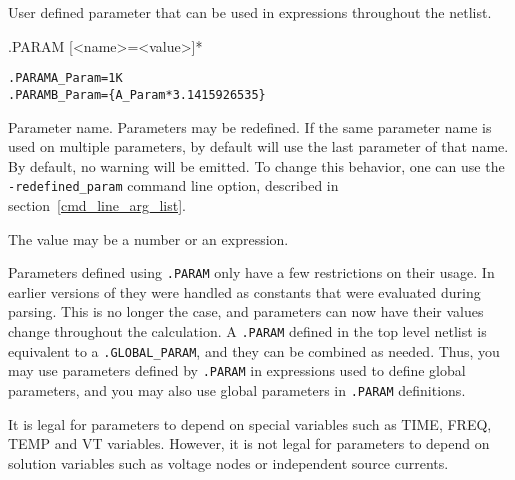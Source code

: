 



User defined parameter that can be used in expressions throughout the netlist.

\begin{Command}

\format
.PARAM [<name>=<value>]*

\examples
\begin{alltt}
.PARAM A_Param=1K
.PARAM B_Param=\{A_Param*3.1415926535\}
\end{alltt}

\arguments

\begin{Arguments}


Parameter name.  Parameters may be redefined.  
If the same parameter name is used on multiple parameters, \Xyce{} by default will use the last parameter of that name.  By default, no warning will be emitted.
To change this behavior, one can use the \texttt{-redefined\_param} command line option, described in section~\ref{cmd_line_arg_list}.


The value may be a number or an expression.
\end{Arguments}

\comments
Parameters defined using \texttt{.PARAM} only have a few restrictions on their 
  usage.  In earlier versions of \Xyce{} they were handled as constants that 
  were evaluated during parsing.  This is no longer the case, and parameters 
  can now have their values change throughout the calculation.   A \texttt{.PARAM} 
  defined in the top level netlist is equivalent to 
  a \texttt{.GLOBAL\_PARAM}, and they can be combined as needed.
Thus, you may use parameters defined by \texttt{.PARAM} in expressions used to
define global parameters, and you may also use global parameters in
\texttt{.PARAM} definitions.  

It is legal for parameters to depend on special variables such as 
  TIME, FREQ, TEMP and VT variables.  However, it is not legal for parameters 
  to depend on solution variables such as voltage nodes or independent source currents.


\end{Command}
